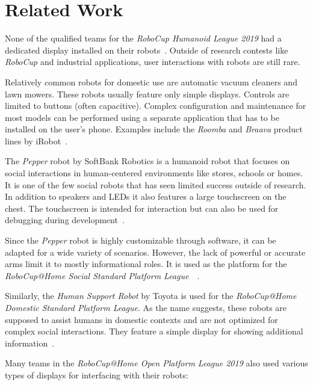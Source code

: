 \chapter{Related Work}
\label{related-work}

None of the qualified teams for the \textit{RoboCup Humanoid League 2019} had a dedicated display
installed on their robots~\cite{robocup-humanoid-teams}. Outside of research contests like
\textit{RoboCup} and industrial applications, user interactions with robots are still rare.
\bigbreak

Relatively common robots for domestic use are automatic vacuum cleaners and lawn mowers. These robots
usually feature only simple displays. Controls are limited to buttons (often capacitive). Complex
configuration and maintenance for most models can be performed using a separate application that has
to be installed on the user's phone. Examples include the \textit{Roomba} and \textit{Braava} product
lines by iRobot~\cite{irobot-website}.

The \textit{Pepper} robot by SoftBank Robotics is a humanoid robot that focuses on social interactions
in human-centered environments like stores, schools or homes. It is one of the few social robots that
has seen limited success outside of research. In addition to speakers and LEDs it also features a
large touchscreen on the chest. The touchscreen is intended for interaction but can also be used for
debugging during development~\cite{pepper-robot}.

Since the \textit{Pepper} robot is highly customizable through software, it can be adapted for a wide
variety of scenarios. However, the lack of powerful or accurate arms limit it to mostly informational
roles. It is used as the platform for the \textit{RoboCup@Home Social Standard Platform League}~\
\cite{pepper-robot}.

Similarly, the \textit{Human Support Robot} by Toyota is used for the \textit{RoboCup@Home Domestic
Standard Platform League}. As the name suggests, these robots are supposed to assist humans in
domestic contexts and are not optimized for complex social interactions. They feature a simple
display for showing additional information~\cite{human-support-robot}.

Many teams in the \textit{RoboCup@Home Open Platform League 2019} also used various types of displays
for interfacing with their robots:

